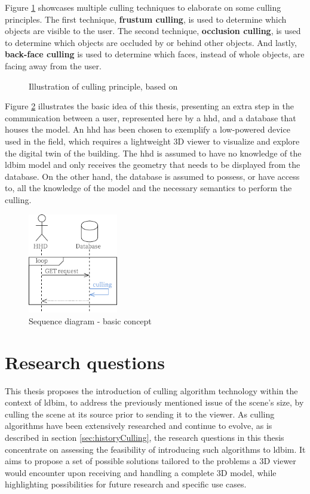 Figure \ref{fig:cullingPrinciple} showcases multiple culling techniques to elaborate on some culling principles. The first technique, \textbf{frustum culling}, is used to determine which objects are visible to the user. The second technique, \textbf{occlusion culling}, is used to determine which objects are occluded by or behind other objects. And lastly, \textbf{back-face culling} is used to determine which faces, instead of whole objects, are facing away from the user.

\begin{figure}[h]
	\centering
	
	\caption[Illustration of culling principle]{Illustration of culling principle, based on \cite{CullingPrinciples}}
	\label{fig:cullingPrinciple}
\end{figure}

Figure \ref{fig:firstIdea} illustrates the basic idea of this thesis, presenting an extra step in the communication between a user, represented here by a \ac{hhd}, and a database that houses the model. An \ac{hhd} has been chosen to exemplify a low-powered device used in the field, which requires a lightweight 3D viewer to visualize and explore the digital twin of the building. The \ac{hhd} is assumed to have no knowledge of the \ac{ldbim} model and only receives the geometry that needs to be displayed from the database. On the other hand, the database is assumed to possess, or have access to, all the knowledge of the model and the necessary semantics to perform the culling.

\begin{figure}[H]
	\centering
	\includegraphics[width=0.35\textwidth]{figures/pdf/first idea.pdf}
	\caption{Sequence diagram - basic concept}
	\label{fig:firstIdea}
\end{figure}


\section{Research questions}\label{sec:researchQuestions}
This thesis proposes the introduction of culling algorithm technology within the context of \ac{ldbim}, to address the previously mentioned issue of the scene's size, by culling the scene at its source prior to sending it to the viewer. As culling algorithms have been extensively researched and continue to evolve, as is described in section \ref{sec:historyCulling}, the research questions in this thesis concentrate on assessing the feasibility of introducing such algorithms to \ac{ldbim}. It aims to propose a set of possible solutions tailored to the problems a 3D viewer would encounter upon receiving and handling a complete 3D model, while highlighting possibilities for future research and specific use cases.

